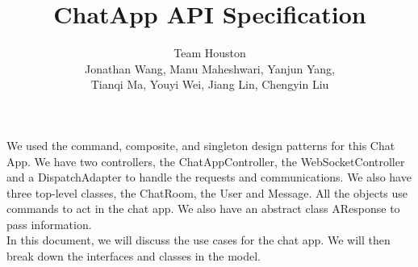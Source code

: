 \documentclass[letterpaper, 11pt]{article}
\title{ChatApp API Specification}
\author{Team Houston\\ Jonathan Wang, Manu Maheshwari, Yanjun Yang,\\ Tianqi Ma, Youyi Wei, Jiang Lin, Chengyin Liu}
\date{}
\begin{document}
\maketitle

We used the command, composite, and singleton design patterns for this Chat App. We have two controllers, the ChatAppController, the WebSocketController  and a DispatchAdapter to handle the requests and communications. We also have three top-level classes, the ChatRoom, the User and Message. All the objects use commands to act in the chat app. We also have an abstract class AResponse to pass information. \\

In this document, we will discuss the use cases for the chat app. We will then break down the interfaces and classes in the model. 
\end{document}
